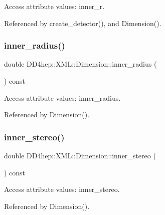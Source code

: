 Access attribute values\+: inner\+\_\+r. 



Referenced by create\+\_\+detector(), and Dimension().

\hypertarget{struct_d_d4hep_1_1_x_m_l_1_1_dimension_aed7c23e43e99fc9fe6fa0e5c6338c86c}{}\label{struct_d_d4hep_1_1_x_m_l_1_1_dimension_aed7c23e43e99fc9fe6fa0e5c6338c86c} 
\subsubsection{\texorpdfstring{inner\+\_\+radius()}{inner\_radius()}}
{\footnotesize\ttfamily double D\+D4hep\+::\+X\+M\+L\+::\+Dimension\+::inner\+\_\+radius (\begin{DoxyParamCaption}{ }\end{DoxyParamCaption}) const}



Access attribute values\+: inner\+\_\+radius. 



Referenced by Dimension().

\hypertarget{struct_d_d4hep_1_1_x_m_l_1_1_dimension_acd6f47f589b45b86da5407f1973cca82}{}\label{struct_d_d4hep_1_1_x_m_l_1_1_dimension_acd6f47f589b45b86da5407f1973cca82} 
\subsubsection{\texorpdfstring{inner\+\_\+stereo()}{inner\_stereo()}}
{\footnotesize\ttfamily double D\+D4hep\+::\+X\+M\+L\+::\+Dimension\+::inner\+\_\+stereo (\begin{DoxyParamCaption}{ }\end{DoxyParamCaption}) const}



Access attribute values\+: inner\+\_\+stereo. 



Referenced by Dimension().

\hypertarget{struct_d_d4hep_1_1_x_m_l_1_1_dimension_ad6fc4d9859b2a1651ab06ebef751ae4d}{}\label{struct_d_d4hep_1_1_x_m_l_1_1_dimension_ad6fc4d9859b2a1651ab06ebef751ae4d} 
